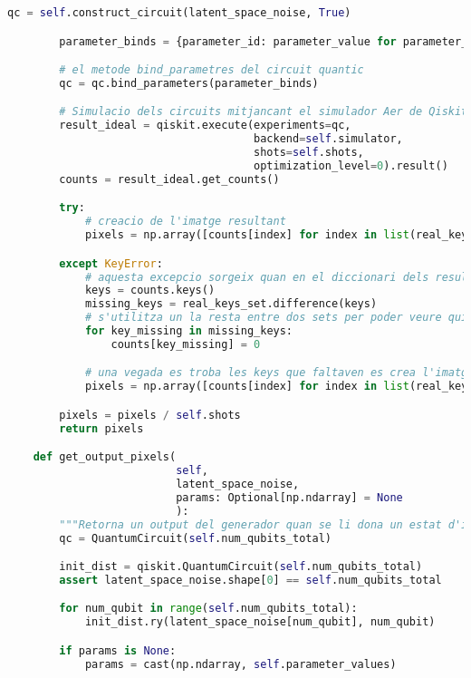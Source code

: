 \begin{lstlisting}[language=Python, caption=Codi final pel generador]
		qc = self.construct_circuit(latent_space_noise, True)

		parameter_binds = {parameter_id: parameter_value for parameter_id, parameter_value in zip(qc.parameters, parameters)}

		# el metode bind_parametres del circuit quantic
		qc = qc.bind_parameters(parameter_binds)

		# Simulacio dels circuits mitjancant el simulador Aer de Qiskit. El nivell d'optimitzacio es zero, perque al ser circuits petits i que simulen una vegada, no es necessari. Al optimitzar el proces acaba sent mes lent.
		result_ideal = qiskit.execute(experiments=qc,
									  backend=self.simulator,
									  shots=self.shots,
									  optimization_level=0).result()
		counts = result_ideal.get_counts()

		try:
			# creacio de l'imatge resultant
			pixels = np.array([counts[index] for index in list(real_keys_list)])

		except KeyError:
			# aquesta excepcio sorgeix quan en el diccionari dels resultats no estan totes les keys pel fet que qiskit, en cas de que no hi hagi un mesurament en una base, no inclou aquesta base en el diccionari
			keys = counts.keys()
			missing_keys = real_keys_set.difference(keys)
			# s'utilitza un la resta entre dos sets per poder veure quina es la key que falta en el diccionari
			for key_missing in missing_keys:
				counts[key_missing] = 0

			# una vegada es troba les keys que faltaven es crea l'imatge resultant
			pixels = np.array([counts[index] for index in list(real_keys_list)])

		pixels = pixels / self.shots
		return pixels

	def get_output_pixels(
					 	  self,
						  latent_space_noise,
						  params: Optional[np.ndarray] = None
						  ):
		"""Retorna un output del generador quan se li dona un estat d'input i opcionalment uns parametres en especific. Cada pixel es la probabilitat de que un qubits resulti en l'estat ket_0, per tant, els valors cada pixel (que son independents entre si) es troba en l'interval (0, 1) """
		qc = QuantumCircuit(self.num_qubits_total)

		init_dist = qiskit.QuantumCircuit(self.num_qubits_total)
		assert latent_space_noise.shape[0] == self.num_qubits_total

		for num_qubit in range(self.num_qubits_total):
			init_dist.ry(latent_space_noise[num_qubit], num_qubit)

		if params is None:
			params = cast(np.ndarray, self.parameter_values)


\end{lstlisting}
